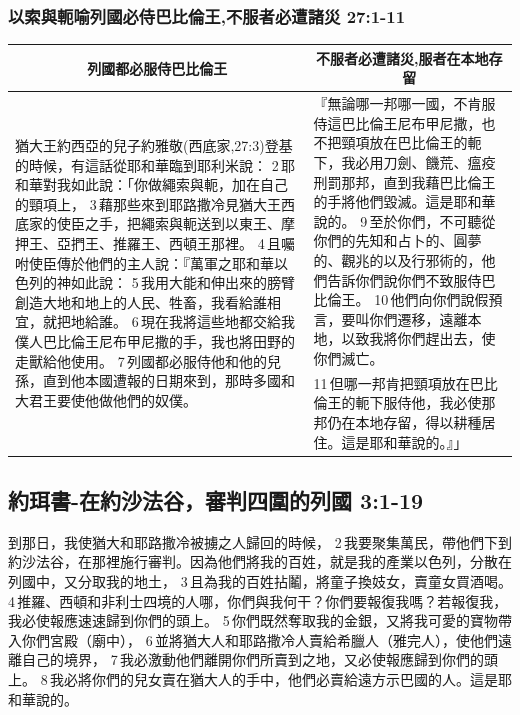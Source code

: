 \subsubsection{以索與軛喻列國必侍巴比倫王,不服者必遭諸災 27:1-11}
\begin{table}[H]
\centering
\begin{tabular}{p{9.25cm}|p{8.25cm}}\hline\hline
\multicolumn{1}{c|}{列國都必服侍巴比倫王}&\multicolumn{1}{c}{不服者必遭諸災,服者在本地存留}\\\hline
\multirow{2}{9.4cm}{猶大王約西亞的兒子約雅敬(西底家,27:3)登基的時候，有這話從耶和華臨到耶利米說： 2 耶和華對我如此說：「你做繩索與軛，加在自己的頸項上， 3 藉那些來到耶路撒冷見猶大王西底家的使臣之手，把繩索與軛送到以東王、摩押王、亞捫王、推羅王、西頓王那裡。 4 且囑咐使臣傳於他們的主人說：『萬軍之耶和華以色列的神如此說： 5 我用大能和伸出來的膀臂創造大地和地上的人民、牲畜，我看給誰相宜，就把地給誰。 6 現在我將這些地都交給我僕人巴比倫王尼布甲尼撒的手，我也將田野的走獸給他使用。 7 列國都必服侍他和他的兒孫，直到他本國遭報的日期來到，那時多國和大君王要使他做他們的奴僕。}
&『無論哪一邦哪一國，不肯服侍這巴比倫王尼布甲尼撒，也不把頸項放在巴比倫王的軛下，我必用刀劍、饑荒、瘟疫刑罰那邦，直到我藉巴比倫王的手將他們毀滅。這是耶和華說的。 9 至於你們，不可聽從你們的先知和占卜的、圓夢的、觀兆的以及行邪術的，他們告訴你們說你們不致服侍巴比倫王。 10 他們向你們說假預言，要叫你們遷移，遠離本地，以致我將你們趕出去，使你們滅亡。\\\cline{2-2}
&11 但哪一邦肯把頸項放在巴比倫王的軛下服侍他，我必使那邦仍在本地存留，得以耕種居住。這是耶和華說的。』」\\\hline
\end{tabular}
\end{table}

\subsection{約珥書-在約沙法谷，審判四圍的列國 3:1-19}
到那日，我使猶大和耶路撒冷被擄之人歸回的時候， 2 我要聚集萬民，帶他們下到約沙法谷，在那裡施行審判。因為他們將我的百姓，就是我的產業以色列，分散在列國中，又分取我的地土， 3 且為我的百姓拈鬮，將童子換妓女，賣童女買酒喝。 4 推羅、西頓和非利士四境的人哪，你們與我何干？你們要報復我嗎？若報復我，我必使報應速速歸到你們的頭上。 5 你們既然奪取我的金銀，又將我可愛的寶物帶入你們宮殿（廟中）， 6 並將猶大人和耶路撒冷人賣給希臘人（雅完人），使他們遠離自己的境界， 7 我必激動他們離開你們所賣到之地，又必使報應歸到你們的頭上。 8 我必將你們的兒女賣在猶大人的手中，他們必賣給遠方示巴國的人。這是耶和華說的。

